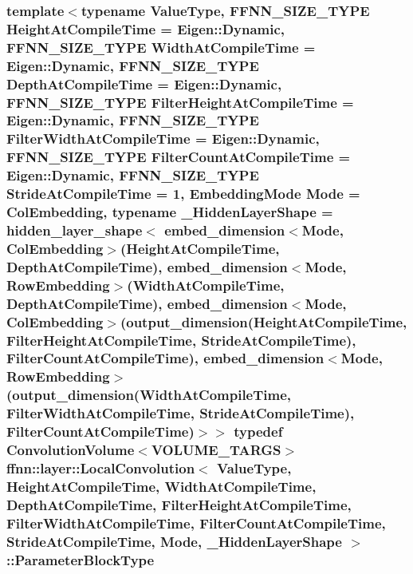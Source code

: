 \hypertarget{classffnn_1_1layer_1_1_local_convolution_ab24fb486de20440b5e67853b079dbab2}{
\subsubsection[{Parameter\-Block\-Type}]{\setlength{\rightskip}{0pt plus 5cm}template$<$typename Value\-Type, F\-F\-N\-N\-\_\-\-S\-I\-Z\-E\-\_\-\-T\-Y\-P\-E Height\-At\-Compile\-Time = Eigen\-::\-Dynamic, F\-F\-N\-N\-\_\-\-S\-I\-Z\-E\-\_\-\-T\-Y\-P\-E Width\-At\-Compile\-Time = Eigen\-::\-Dynamic, F\-F\-N\-N\-\_\-\-S\-I\-Z\-E\-\_\-\-T\-Y\-P\-E Depth\-At\-Compile\-Time = Eigen\-::\-Dynamic, F\-F\-N\-N\-\_\-\-S\-I\-Z\-E\-\_\-\-T\-Y\-P\-E Filter\-Height\-At\-Compile\-Time = Eigen\-::\-Dynamic, F\-F\-N\-N\-\_\-\-S\-I\-Z\-E\-\_\-\-T\-Y\-P\-E Filter\-Width\-At\-Compile\-Time = Eigen\-::\-Dynamic, F\-F\-N\-N\-\_\-\-S\-I\-Z\-E\-\_\-\-T\-Y\-P\-E Filter\-Count\-At\-Compile\-Time = Eigen\-::\-Dynamic, F\-F\-N\-N\-\_\-\-S\-I\-Z\-E\-\_\-\-T\-Y\-P\-E Stride\-At\-Compile\-Time = 1, Embedding\-Mode Mode = Col\-Embedding, typename \-\_\-\-Hidden\-Layer\-Shape = hidden\-\_\-layer\-\_\-shape$<$              embed\-\_\-dimension$<$\-Mode, Col\-Embedding$>$(\-Height\-At\-Compile\-Time, Depth\-At\-Compile\-Time),              embed\-\_\-dimension$<$\-Mode, Row\-Embedding$>$(\-Width\-At\-Compile\-Time,  Depth\-At\-Compile\-Time),              embed\-\_\-dimension$<$\-Mode, Col\-Embedding$>$(output\-\_\-dimension(\-Height\-At\-Compile\-Time, Filter\-Height\-At\-Compile\-Time, Stride\-At\-Compile\-Time), Filter\-Count\-At\-Compile\-Time),              embed\-\_\-dimension$<$\-Mode, Row\-Embedding$>$(output\-\_\-dimension(\-Width\-At\-Compile\-Time,  Filter\-Width\-At\-Compile\-Time,  Stride\-At\-Compile\-Time), Filter\-Count\-At\-Compile\-Time)$>$$>$ typedef {\bf Convolution\-Volume}$<${\bf V\-O\-L\-U\-M\-E\-\_\-\-T\-A\-R\-G\-S}$>$ {\bf ffnn\-::layer\-::\-Local\-Convolution}$<$ Value\-Type, Height\-At\-Compile\-Time, Width\-At\-Compile\-Time, Depth\-At\-Compile\-Time, Filter\-Height\-At\-Compile\-Time, Filter\-Width\-At\-Compile\-Time, Filter\-Count\-At\-Compile\-Time, Stride\-At\-Compile\-Time, Mode, \-\_\-\-Hidden\-Layer\-Shape $>$\-::{\bf Parameter\-Block\-Type}}}\label{classffnn_1_1layer_1_1_local_convolution_ab24fb486de20440b5e67853b079dbab2}


